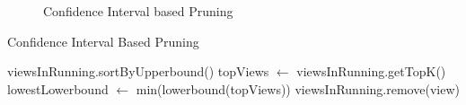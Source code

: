 \begin{figure}[h]
\vspace{-10pt}
\centerline{
\hbox{}}
\vspace{-20pt}
\caption{Confidence Interval based Pruning}
\label{fig:conf_interval}
\vspace{-15pt}
\end{figure}




\begin{algorithm}
\caption{Confidence Interval Based Pruning}
\label{algo:ci_based_pruning}
\begin{algorithmic}[1]
\State viewsInRunning.sortByUpperbound()
\State topViews $\gets$ viewsInRunning.getTopK()
\State lowestLowerbound $\gets$ min(lowerbound(topViews))
\State viewsInRunning.remove(view)
\EndIf
\EndFor
\end{algorithmic}
\end{algorithm}

